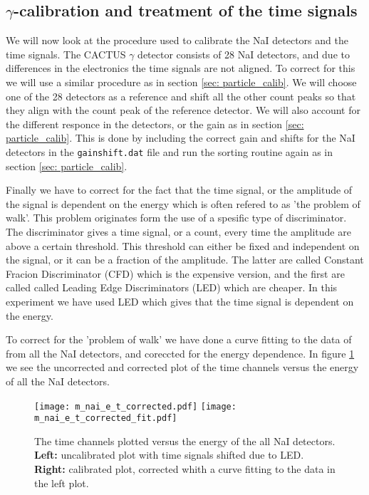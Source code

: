 \documentclass[11pt,a4wide]{article}
\begin{document}
\subsection{$\gamma$-calibration and treatment of the time signals}
We will now look at the procedure used to calibrate the NaI detectors and the time signals. The CACTUS $\gamma$ detector consists of 28 NaI detectors, and due to differences in the electronics the time signals are not aligned. To correct for this we will use a similar procedure as in section \ref{sec: particle_calib}. We will choose one of the 28 detectors as a reference and shift all the other count peaks so that they align with the count peak of the reference detector. We will also account for the different responce in the detectors, or the gain as in section \ref{sec: particle_calib}. This is done by including the correct gain and shifts for the NaI detectors in the \texttt{gainshift.dat} file and run the sorting routine again as in section \ref{sec: particle_calib}.

Finally we have to correct for the fact that the time signal, or the amplitude of the signal is dependent on the energy which is often refered to as 'the problem of walk'. This problem originates form the use of a spesific type of discriminator. The discriminator gives a time signal, or a count, every time the amplitude are above a certain threshold. This threshold can either be fixed and independent on the signal, or it can be a fraction of the amplitude. The latter are called Constant Fracion Discriminator (CFD) which is the expensive version, and the first are called called Leading Edge Discriminators (LED) which are cheaper. In this experiment we have used LED which gives that the time signal is dependent on the energy. 

To correct for the 'problem of walk' we have done a curve fitting to the data of from all the NaI detectors, and coreccted for the energy dependence. In figure \ref{fig: time_corr} we see the uncorrected and corrected plot of the time channels versus the energy of all the NaI detectors.

\begin{figure}[htp]
\centering
\texttt{[image: m\_nai\_e\_t\_corrected.pdf]}
\texttt{[image: m\_nai\_e\_t\_corrected\_fit.pdf]}
\caption{The time channels plotted versus the energy of the all NaI detectors. \textbf{Left:} uncalibrated plot with time signals shifted due to LED. \textbf{Right:} calibrated plot, corrected whith a curve fitting to the data in the left plot.}
\label{fig: time_corr}
\end{figure}
\end{document}
